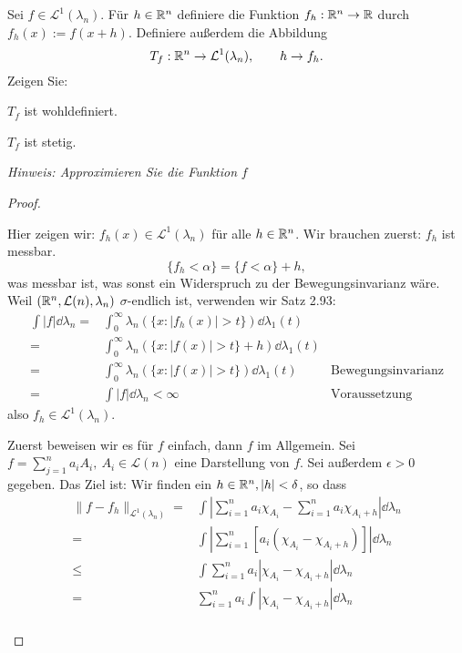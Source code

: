 \begin{Problem}
	Sei $f\in \mathcal{L}^1(\lambda_n)$. F\"{u}r $h\in \mathbb{R}^n$ definiere die Funktion $f_h:\mathbb{R}^n\to \mathbb{R}$ durch $f_h(x):=f(x+h)$. Definiere außerdem die Abbildung
	\[
	T_f:\mathbb{R}^n\to \mathcal{L}^1(\lambda_n),\qquad h\to f_h
	.\] 
	Zeigen Sie:
	\begin{parts}
		\item $T_f$ ist wohldefiniert.
		\item $T_f$ ist stetig.
	\end{parts}
{\footnotesize \emph{Hinweis: Approximieren Sie die Funktion }$f$ }
\end{Problem}

\begin{proof}
	\begin{parts}
	\item Hier zeigen wir: $f_h(x)\in \mathcal{L}^1(\lambda_n)$ f\"{u}r alle $h\in \mathbb{R}^n$. Wir brauchen zuerst: $f_h$ ist messbar. 
		\[
	\{f_h<\alpha\} =\{f<\alpha\} +h
,\]
		was messbar ist, was sonst ein Widerspruch zu der Bewegungsinvarianz wäre. Weil $(\mathbb{R}^n, \mathcal{L}(n), \lambda_n)$ $\sigma$-endlich ist, verwenden wir Satz 2.93:
		\begin{align*}
			\int |f|\dd{\lambda_n}=&\int_0^\infty \lambda_n(\{x:|f_h(x)|>t\})\dd{\lambda_1(t)}\\
			=&\int_0^\infty \lambda_n(\{x:|f(x)|>t\} +h)\dd{\lambda_1(t)}\\
			=&\int_0^\infty \lambda_n(\{x:|f(x)|>t\})\dd{\lambda_1(t)} & \text{Bewegungsinvarianz}\\
			=&\int |f|\dd{\lambda_n}<\infty & \text{Voraussetzung}
		\end{align*}
also $f_h\in \mathcal{L}^1(\lambda_n)$.
\item Zuerst beweisen wir es f\"{u}r $f$ einfach, dann $f$ im Allgemein. Sei $f=\sum_{j=1}^n a_i A_i,~A_i\in \mathcal{L}(n)$ eine Darstellung von $f$. Sei außerdem $\epsilon>0$ gegeben. Das Ziel ist: Wir finden ein $h\in\mathbb{R}^n,|h|<\delta$, so dass
	\begin{align*}
		\|f-f_h\|_{\mathcal{L}^1(\lambda_n)}=&\int\left| \sum_{i=1}^n a_i \chi_{A_i}-\sum_{i=1}^n a_i\chi_{A_i+h} \right| \dd{\lambda_n}\\
		=&\int\left| \sum_{i=1}^n\left[ a_i\left( \chi_{A_i}-\chi_{A_i+h} \right)  \right]  \right| \dd{\lambda_n}\\
		\le&\int \sum_{i=1}^n a_i|\chi_{A_i}-\chi_{A_i+h}|\dd{\lambda_n}\\
		=&\sum_{i=1}^n a_i\int |\chi_{A_i}-\chi_{A_i+h}|\dd{\lambda_n}\\

\end{align*}
\end{parts}
\end{proof}
